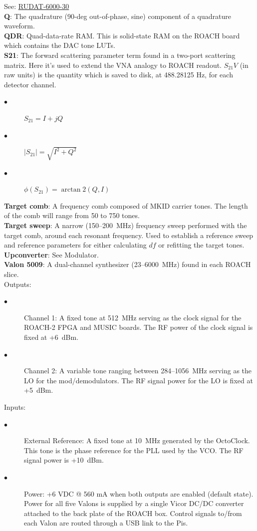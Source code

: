 See: \href{https://www.minicircuits.com/pdfs/RUDAT-6000-30.pdf}{RUDAT-6000-30}\\
\textbf{Q}: The quadrature (90-deg out-of-phase, sine) component of a quadrature waveform.\\
\textbf{QDR}: Quad-data-rate RAM\@. This is solid-state RAM on the ROACH board which contains the DAC tone LUTs.\\
\textbf{S21}: The forward scattering parameter term found in a two-port scattering matrix. Here it’s used to extend the VNA analogy to ROACH readout. $S_{21}V$ (in raw units) is the quantity which is saved to disk, at 488.28125 Hz, for each detector channel.
\begin{description}
  \item[$\bullet$] $S_{21} = I + jQ$
  \item[$\bullet$] $\left|S_{21}\right| = \sqrt{I^{2} + Q^{2}}$
  \item[$\bullet$] $\phi(S_{21}) = \arctan2(Q,I)$
\end{description}
\textbf{Target comb}: A frequency comb composed of MKID carrier tones. The length of the comb will range from 50 to 750 tones.\\
\textbf{Target sweep}: A narrow (150--200~MHz) frequency sweep performed with the target comb, around each resonant frequency. Used to establish a reference sweep and reference parameters for either calculating $df$ or refitting the target tones.
\textbf{Upconverter}: See Modulator.\\
\textbf{Valon 5009}: A dual-channel synthesizer (23--6000~MHz) found in each ROACH slice.\\
Outputs:
\begin{description}
  \item[$\bullet$] Channel 1: A fixed tone at 512~MHz serving as the clock signal for the ROACH-2 FPGA and MUSIC boards. The RF power of the clock signal is fixed at +6~dBm.
  \item[$\bullet$] Channel 2: A variable tone ranging between 284--1056~MHz serving as the LO for the mod/demodulators. The RF signal power for the LO is fixed at +5~dBm.
\end{description}
Inputs:
\begin{description}
  \item[$\bullet$] External Reference: A fixed tone at 10~MHz generated by the OctoClock. This tone is the phase reference for the PLL used by the VCO\@. The RF signal power is +10~dBm.
  \item[$\bullet$] Power: +6 VDC @ 560 mA when both outputs are enabled (default state). Power for all five Valons is supplied by a single Vicor DC/DC converter attached to the back plate of the ROACH box. Control signals to/from each Valon are routed through a USB link to the Pis.
\end{description}
